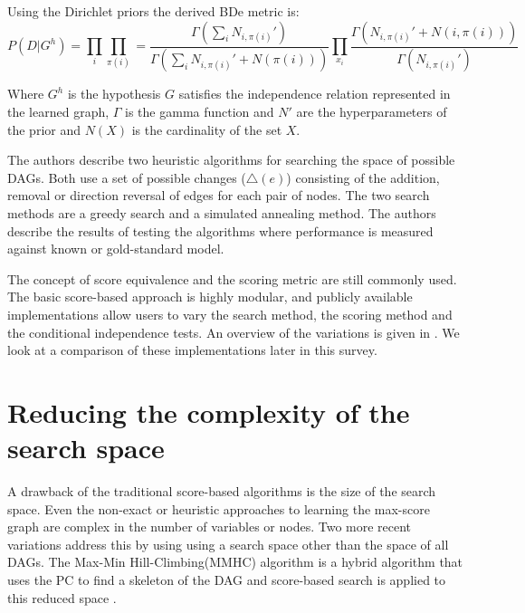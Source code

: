     Using the Dirichlet priors the derived BDe metric is: 
    \[
    P(D|G^h) = \prod_i \prod_{ \pi(i) } = 
    \frac{ \Gamma \left( \sum_{i} N_{i, \pi(i)}' \right) }
    { \Gamma \left( \sum_{i} N_{i, \pi (i)}' + N( \pi(i) ) \right) }
    \prod_{x_i} \frac{\Gamma \left( N_{i, \pi(i)}' + N(i,\pi(i))  \right) }
    { \Gamma\left( N_{i,\pi(i)}' \right)}
    \]

    Where $G^h$ is the hypothesis $G$ satisfies the
    independence relation represented in the learned graph, 
     $\Gamma$ is the gamma function and 
     $N'$ are the hyperparameters of the prior and $N(X)$ 
     is the cardinality of the set $X$. 

     The authors describe two heuristic algorithms for
    searching the space of possible DAGs. Both use a set of 
    possible changes ($\triangle(e)$) consisting of the addition, removal
    or direction reversal of edges for each pair of nodes. The two
    search methods are a greedy search and a simulated annealing method.
    The authors  describe the results of testing the 
    algorithms where performance is measured against 
    known or gold-standard model. 

    The concept of score equivalence and the scoring metric are
    still commonly used. The basic score-based approach is highly
    modular, and publicly available implementations allow
    users to vary the search method, the scoring method and
    the conditional independence tests. An overview of the
    variations is given in \cite{Zhou2007}. We look at a comparison
    of these implementations later in this survey.

    \section{Reducing the complexity of the search space}

    A drawback of the traditional score-based algorithms is the
    size of the search space. Even the non-exact or heuristic approaches
    to learning the max-score graph are complex in the number of 
    variables or nodes. Two more recent variations address this
    by using using a search space other than the space of all DAGs. The 
    Max-Min Hill-Climbing(MMHC) algorithm is a hybrid algorithm that
    uses the PC to find a skeleton
    of the DAG and score-based search is applied to this reduced space  
    \cite{Maathuis2015}. 

